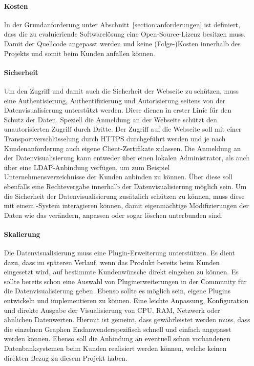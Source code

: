 \paragraph{Kosten}
\begin{outline}
  \1 In der Grundanforderung unter Abschnitt~\ref{section:anforderungen} ist
  definiert, dass die zu evaluieriende Softwarelösung eine
  Open\hyp{}Source\hyp{}Lizenz besitzen muss. Damit der Quellcode angepasst
  werden und keine (Folge\hyp{})Kosten innerhalb des Projekts und somit beim
  Kunden anfallen können.
\end{outline}

\paragraph{Sicherheit}
\begin{outline}
  \1 Um den Zugriff und damit auch die Sicherheit der Webseite zu
  schützen, muss eine Authentisierung, Authentifizierung und Autorisierung
  seitens von der Datenvisualisierung unterstützt werden. Diese dienen in
  erster Linie für den Schutz der Daten. Speziell die Anmeldung an der Webseite
  schützt den unautorisierten Zugriff durch Dritte. Der Zugriff auf die
  Webseite soll mit einer Transportverschlüsselung durch \gls{HTTPS}
  durchgeführt werden und je nach Kundenanforderung auch eigene
  Client\hyp{}Zertifikate zulassen. Die Anmeldung an der Datenvisualisierung
  kann entweder über einen lokalen Administrator, als auch über eine
  \gls{LDAP}\hyp{}Anbindung verfügen, um zum Beispiel Unternehmensverzeichnisse
  der Kunden anbinden zu können. Über diese soll ebenfalls eine Rechtevergabe
  innerhalb der Datenvisualisierung möglich sein.
  \1 Um die Sicherheit der Datenvisualisierung zusätzlich schützen zu können,
  muss diese mit einem \hyp{}System interagieren können, damit
  eigenmächtige Modifizierungen der Daten wie das verändern, anpassen oder
  sogar löschen unterbunden sind.
\end{outline}

\paragraph{Skalierung}
\begin{outline}
  \1 Die Datenvisualisierung muss eine Plugin\hyp{}Erweiterung unterstützen. Es
  dient dazu, dass im späteren Verlauf, wenn das Produkt bereits beim Kunden
  eingesetzt wird, auf bestimmte Kundenwünsche direkt eingehen zu können. Es
  sollte bereits schon eine Auswahl von Pluginerweiterungen in der Community
  für die Datenvisualisierung geben. Ebenso sollte es möglich sein, eigene
  Plugins entwickeln und implementieren zu können.
  \1 Eine leichte Anpassung, Konfiguration und direkte Ausgabe der
  Visualisierung von CPU, RAM, Netzwerk oder ähnlichen Datenwerten. Hiermit ist
  gemeint, dass gewährleistet werden muss, dass die einzelnen Graphen
  Endanwenderspezifisch schnell und einfach angepasst werden können. Ebenso
  soll die Anbindung an eventuell schon vorhandenen Datenbanksystemen beim
  Kunden realisiert werden können, welche keinen direkten Bezug zu diesem
  Projekt haben.
\end{outline}

